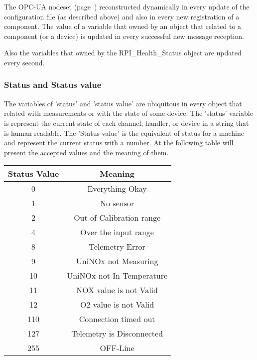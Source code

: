 The OPC-UA nodeset (page~\pageref{tree:OPC_UA_nodeset}) reconstructed dynamically in every update of the configuration file (as described above) and also in every new registration of a component.
The value of a variable that owned by an object that related to a component (or a device) is updated in every successful new message reception.

Also the variables that owned by the RPI\_Health\_Status object are updated every second.

\subsubsection{Status and Status value}
 The variables of 'status' and 'status value' are ubiquitous in every object that related with measurements or with the state of some device.
 The 'status' variable is represent the current state of each channel, handler, or device in a string that is human readable. The 'Status value' is the equivalent of status for a machine
 and represent the current status with a number. At the following table will present the accepted values and the meaning of them.
 \begin{center}
 \begin{tabular}{||c | c||}
 \hline
 Status Value & Meaning \\ [0.5ex]
 \hline\hline
 0 & Everything Okay \\
 \hline
 1 & No sensor\\
 \hline
 2 & Out of Calibration range\\
 \hline
 4 & Over the input range\\
 \hline
 8 & Telemetry Error\\
 \hline
 9 & UniNOx not Measuring\\
 \hline
 10 & UniNOx not In Temperature\\
 \hline
 11 & NOX value is not Valid\\
 \hline
 12 & O2 value is not Valid\\
 \hline
 110 & Connection timed out\\
 \hline
 127 & Telemetry is Disconnected\\
 \hline
 255 & OFF-Line\\
 \hline
\end{tabular}
\end{center}

